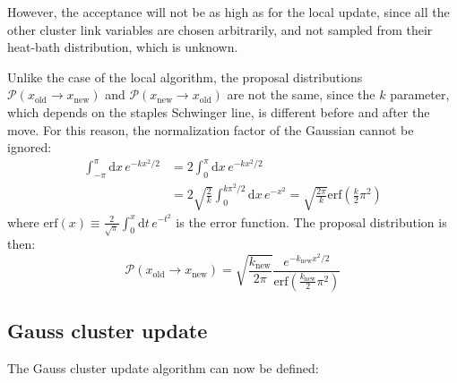 However, the acceptance will not be as high as for the local update,
since all the other cluster link variables are chosen arbitrarily,
and not sampled from their heat-bath distribution, which is unknown.

Unlike the case of the local algorithm,
the proposal distributions $\mathcal P(x_\mathrm{old}\to x_\mathrm{new})$ and $\mathcal P(x_\mathrm{new}\to x_\mathrm{old})$
are not the same, since the $k$ parameter,
which depends on the staples Schwinger line, is different before and after the move.
For this reason, the normalization factor of the Gaussian cannot be ignored:
\[\begin{aligned}
    \int_{-\pi}^\pi\mathrm dx\,e^{-kx^2/2} &= 2\int_0^\pi\mathrm dx\,e^{-kx^2/2} \\
                                           &= 2\sqrt{\frac{2}{k}}\int_0^{k\pi^2/2}\mathrm dx\,e^{-x^2} = \sqrt{\frac{2\pi}{k}}\mathrm{erf}\left(\frac{k}{2}\pi^2\right)
\end{aligned}\]
where $\mathrm{erf}(x) \equiv \frac{2}{\sqrt\pi}\int_0^x\mathrm dt\,e^{-t^2}$ is the error function.
The proposal distribution is then:
\begin{equation}\label{eq:gauss_cluster_proposal}
    \mathcal P(x_\mathrm{old}\to x_\mathrm{new})=\sqrt{\frac{k_\mathrm{new}}{2\pi}}\frac{e^{-k_\mathrm{new}x^2/2}}{\mathrm{erf}\left(\frac{k_\mathrm{new}}{2}\pi^2\right)}
\end{equation}

\subsection*{Gauss cluster update}

The Gauss cluster update algorithm can now be defined:

